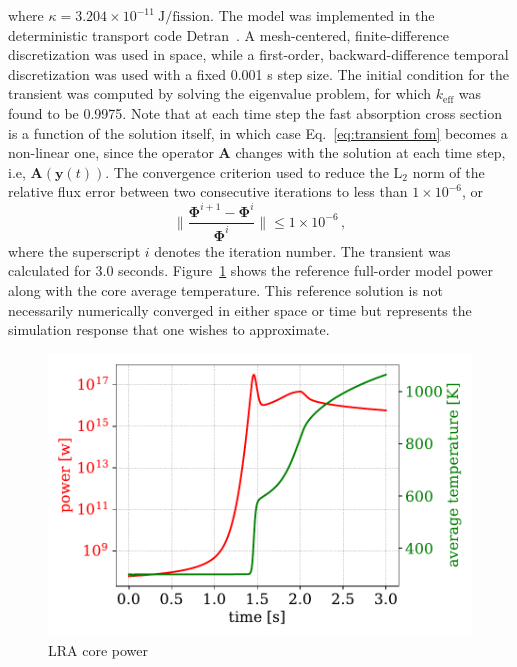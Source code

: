 \documentclass[review,number,sort&compress,12pt]{elsarticle}
\begin{document}
where $\kappa = 3.204\times 10^{-11}~ \text{J/fission}$.
The model was implemented in the deterministic transport code Detran~\cite{roberts2014advanced}.
A mesh-centered, finite-difference discretization was used in space, while a first-order, backward-difference temporal discretization was used with a fixed 0.001 s step size.  
The initial condition for the transient was computed by solving the eigenvalue problem, for which $k_{\text{eff}}$ was found to be 0.9975.
Note that at each time step the fast absorption cross section is a function of the solution itself, in which case Eq.~\ref{eq:transient fom} becomes a non-linear one, since the operator $\mathbf{A}$ changes with the solution at each time step, i.e, $\mathbf{A}(\mathbf{y}(t))$. 
The convergence criterion used to reduce the $\text{L}_2$ norm  of the relative flux error between two consecutive iterations to less than $1\times 10^{-6}$, or
\begin{equation}
\|\frac{\mathbf{\Phi}^{i+1} - \mathbf{\Phi}^{i}} {\mathbf{\Phi}^i}\| \le  1\times 10^{-6} \, ,
\label{eq:convergance criteria} 
\end{equation}
where the superscript $i$ denotes the iteration number.
The transient was calculated for 3.0 seconds.
Figure~\ref{fig:lra fom power} shows the reference full-order model power along with the core average temperature.
This reference solution is not necessarily numerically converged in either space or time but represents the simulation response that one wishes to approximate.
\begin{figure}[h!]
	\includegraphics[width=1.0\linewidth]{../figures/LRA_fom_power_temperature.pdf}
	\caption{LRA core power}
	\label{fig:lra fom power}
\end{figure}
\end{document}

